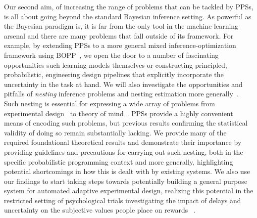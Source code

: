 Our second aim, of increasing the range of problems that can be tackled by PPSs, is all about
going beyond the standard Bayesian inference setting.  As powerful as the Bayesian paradigm is,
it is far from the only tool in the machine learning arsenal and there are many problems that fall
outside of its framework.  For example, by extending PPSs to a more general mixed
inference-optimization framework using BOPP~\cite{rainforth2016nips}, we open the door to
a number of fascinating opportunities such learning models themselves or constructing
principled, probabilistic, engineering design pipelines that explicitly incorporate
the uncertainty in the task at hand.  We will also investigate the opportunities and pitfalls
of \emph{nesting} inference problems and nesting estimation more
generally~\citep{rainforth2017pitfalls}.  Such nesting is essential for expressing a wide array
of problems from experimental design~\citep{chaloner1995bayesian} to
theory of mind~\citep{stuhlmuller2014reasoning}.  PPSs provide a highly convenient means
of encoding such problems, but previous results confirming the statistical validity of doing
so remain substantially lacking.  We provide many of the required foundational theoretical results and
demonstrate their importance by providing guidelines and precautions for carrying out such nesting,
both in the specific probabilistic programming context and more generally, highlighting potential
shortcomings in how this is dealt with by existing systems.  We also use our findings to start
taking steps towards potentially building a general purpose system for automated adaptive
experimental design, realizing this potential in the restricted setting of psychological trials
investigating the impact of delays and uncertainty on the subjective values people place
on rewards~\citep{vincent2017darc} .